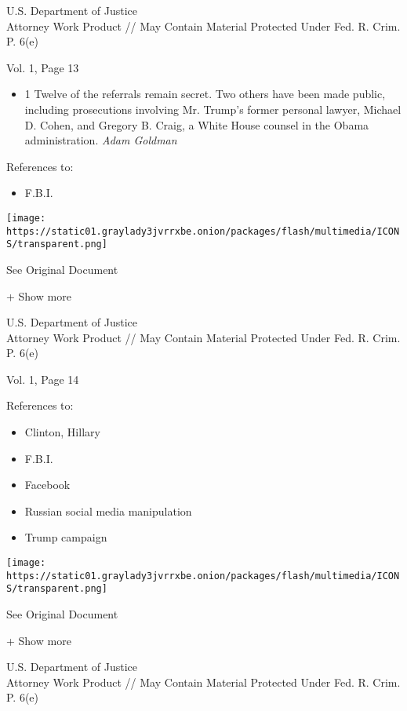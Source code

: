 U.S. Department of Justice\\
Attorney Work Product // May Contain Material Protected Under Fed. R.
Crim. P. 6(e)

Vol. 1, Page 13

\begin{itemize}
\tightlist
\item
  1 Twelve of the referrals remain secret. Two others have been made
  public, including prosecutions involving Mr. Trump's former personal
  lawyer, Michael D. Cohen, and Gregory B. Craig, a White House counsel
  in the Obama administration. \emph{Adam Goldman}
\end{itemize}

References to:

\begin{itemize}
\tightlist
\item
  F.B.I.
\end{itemize}

\protect\hyperlink{}{}

\texttt{[image: https://static01.graylady3jvrrxbe.onion/packages/flash/multimedia/ICONS/transparent.png]}

See Original Document

+ Show more

U.S. Department of Justice\\
Attorney Work Product // May Contain Material Protected Under Fed. R.
Crim. P. 6(e)

Vol. 1, Page 14

References to:

\begin{itemize}
\tightlist
\item
  Clinton, Hillary
\item
  F.B.I.
\item
  Facebook
\item
  Russian social media manipulation
\item
  Trump campaign
\end{itemize}

\protect\hyperlink{}{}

\texttt{[image: https://static01.graylady3jvrrxbe.onion/packages/flash/multimedia/ICONS/transparent.png]}

See Original Document

+ Show more

U.S. Department of Justice\\
Attorney Work Product // May Contain Material Protected Under Fed. R.
Crim. P. 6(e)

